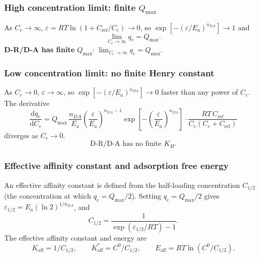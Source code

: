 \documentclass[journal=jacsat,manuscript=article]{achemso}
\begin{document}
\subsubsection{High concentration limit: finite $Q_{\max}$}

As $C_e \to \infty$, $\varepsilon = RT\ln(1+C_{\mathrm{ref}}/C_e) \to 0$, so
$\exp[-(\varepsilon/E_a)^{n_{DA}}] \to 1$ and
\begin{equation}
	\lim_{C_e \to \infty} q_e = Q_{\max}.
\end{equation}
\textbf{D-R/D-A has finite }$Q_{\max}$:\quad
$\displaystyle \lim_{C_e \to \infty} q_e = Q_{\max}$.

\subsubsection{Low concentration limit: no finite Henry constant}

As $C_e \to 0$, $\varepsilon \to \infty$, so
$\exp[-(\varepsilon/E_a)^{n_{DA}}] \to 0$ faster than any power of $C_e$. The derivative
\begin{equation}
	\frac{\mathrm{d}q_e}{\mathrm{d}C_e}
	= Q_{\max}\, \frac{n_{DA}}{E_a}
	\left(\frac{\varepsilon}{E_a}\right)^{n_{DA}-1}
	\exp\!\left[-\left(\frac{\varepsilon}{E_a}\right)^{n_{DA}}\right]
	\cdot \frac{RT\,C_{\mathrm{ref}}}{C_e(C_e+C_{\mathrm{ref}})}
\end{equation}
diverges as $C_e \to 0$.
\begin{equation}
	\boxed{\text{D-R/D-A has no finite } K_H.}
\end{equation}

\subsubsection{Effective affinity constant and adsorption free energy}

An effective affinity constant is defined from the half-loading concentration $C_{1/2}$
(the concentration at which $q_e = Q_{\max}/2$).
Setting $q_e = Q_{\max}/2$ gives $\varepsilon_{1/2} = E_a(\ln 2)^{1/n_{DA}}$, and
\begin{equation}
	C_{1/2} = \frac{1}{\exp(\varepsilon_{1/2}/RT) - 1}.
\end{equation}
The effective affinity constant and energy are
\begin{equation}
	\boxed{
		K_{\mathrm{aff}} = 1/C_{1/2},
		\qquad
		K_{\mathrm{aff}}^{\ast} = C^0/C_{1/2},
		\qquad
		E_{\mathrm{aff}} = RT\ln(C^0/C_{1/2}).
	}
\end{equation}
\end{document}
